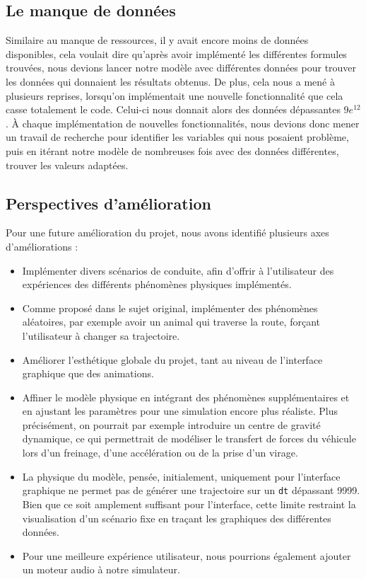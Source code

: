 \subsection{Le manque de données}\label{subsec:manque-data}
Similaire au manque de ressources, il y avait encore moins de données disponibles, cela voulait dire qu'après avoir implémenté les différentes formules trouvées, nous devions lancer notre modèle avec différentes données pour trouver les données qui donnaient les résultats obtenus.
De plus, cela nous a mené à plusieurs reprises, lorsqu'on implémentait une nouvelle fonctionnalité que cela casse totalement le code.
Celui-ci nous donnait alors des données dépassantes $9e^{12}$.
À chaque implémentation de nouvelles fonctionnalités, nous devions donc mener un travail de recherche pour identifier les variables qui nous posaient problème, puis en itérant notre modèle de nombreuses fois avec des données différentes, trouver les valeurs adaptées.



\subsection{Perspectives d'amélioration}\label{subsec:perspectives-d'ameliorations}
Pour une future amélioration du projet, nous avons identifié plusieurs axes d'améliorations :
\begin{itemize}
    \item Implémenter divers scénarios de conduite, afin d'offrir à l'utilisateur des expériences des différents phénomènes physiques implémentés.
    \item Comme proposé dans le sujet original, implémenter des phénomènes aléatoires, par exemple avoir un animal qui traverse la route, forçant l'utilisateur à changer sa trajectoire.
    \item Améliorer l'esthétique globale du projet, tant au niveau de l'interface graphique que des animations.
    \item Affiner le modèle physique en intégrant des phénomènes supplémentaires et en ajustant les paramètres pour une simulation encore plus réaliste.
    Plus précisément, on pourrait par exemple introduire un centre de gravité dynamique, ce qui permettrait de modéliser le transfert de forces du véhicule lors d'un freinage, d'une accélération ou de la prise d'un virage.
    \item La physique du modèle, pensée, initialement, uniquement pour l'interface graphique ne permet pas de générer une trajectoire sur un \texttt{dt} dépassant 9999.
    Bien que ce soit amplement suffisant pour l'interface, cette limite restraint la visualisation d'un scénario fixe en traçant les graphiques des différentes données.
    \item Pour une meilleure expérience utilisateur, nous pourrions également ajouter un moteur audio à notre simulateur.

\end{itemize}


